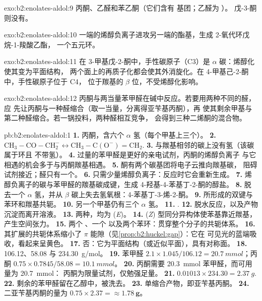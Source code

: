 \begin{solution}{exo:b2:enolates-aldol:9}
丙酮、乙醛和苯乙酮（它们含有  基团；乙醛为 ）。
戊-3-酮则没有。
\end{solution}

\begin{solution}{exo:b2:enolates-aldol:10}
一端的烯醇负离子进攻另一端的酯基，生成 2-氧代环戊烷-1-羧酸乙酯，
一个五元环。
\end{solution}

\begin{solution}{exo:b2:enolates-aldol:11}
在 3-甲基戊-2-酮中，手性碳原子（C3）是 $\alpha$ 碳：烯醇化使其变为平面结构，
两个面上的再质子化都会使其外消旋化。在 4-甲基己-2-酮中，手性碳原子位于 C4，
位于羰基的 $\beta$ 位，不受烯醇化影响。
\end{solution}

\begin{solution}{exo:b2:enolates-aldol:12}
丙酮与两当量苯甲醛在碱中反应。若要用两种不同的醛，应
先让丙酮与一种醛缩合（取一当量，分离得亚苄基丙酮），再
使其剩余甲基与第二种醛缩合。若一锅投料，两种醛相互竞争，
会得到三种二烯酮的混合物。
\end{solution}

\begin{solution}{pb:b2:enolates-aldol:1}
\textbf{1.} 丙酮，含六个 $\alpha$ 氢（每个甲基上三个）。
\textbf{2.} $\mathrm{CH_3{-}CO{-}CH_2^-} \leftrightarrow \mathrm{CH_3{-}C(O^-){=}CH_2}$.
\textbf{3.} 与羰基相邻的碳上没有氢（该碳属于环且
不带氢）。
\textbf{4.} 过量的苯甲醛是更好的亲电试剂，丙酮的烯醇负离子
与它相遇的机会多于与丙酮羰基相遇。
\textbf{5.} 酮有两个碳基团将电子云推向羰基碳，
阻碍试剂接近；醛只有一个。
\textbf{6.} 只需少量烯醇负离子：反应时它会重新生成。
\textbf{7.} 烯醇负离子的碳与苯甲醛的羰基碳成键，生成
4-羟基-4-苯基丁-2-酮的醇盐。
\textbf{8.} 脱去一个 $\alpha$ 氢，并从 $\beta$ 碳上失去氢氧根：4-苯基丁-3-烯-2-酮。
\textbf{9.} 所形成的双键与苯环和羰基共轭。
\textbf{10.} 另一个甲基仍有三个 $\alpha$ 氢。
\textbf{11.} .
\textbf{12.} 脱水反应，以及产物沉淀而离开溶液。
\textbf{13.} 两种，均为 (\textit{E})。
\textbf{14.} (\textit{Z}) 型同分异构体使苯基靠近羰基，产生空间张力。
\textbf{15.} 两个 、一个  以及两个苯环：贯穿整个分子的共轭体系。
\textbf{16.} 其扩展的共轭体系缩小了 $\pi$ 能隙（见\cref{prop:b2:huckel:gap}）：它在
可见光的蓝端吸收，看起来呈黄色。
\textbf{17.} 否：它为平面结构（或近似平面），具有对称面。
\textbf{18.} 106.12、58.08 与 \qty{234.30}{g/mol}。
\textbf{19.} 苯甲醛 $2.1 \times 1.045/106.12 = \qty{20.7}{mmol}$；丙酮 $0.75 \times
0.7845/58.08 = \qty{10.1}{mmol}$。
\textbf{20.} 丙酮需要 \qty{20.3}{mmol} 苯甲醛，而可用量为 \qty{20.7}{mmol}：
丙酮为限量试剂，仅勉强足量。
\textbf{21.} $0.01013 \times 234.30 = \qty{2.37}{g}$.
\textbf{22.} 剩余的苯甲醛留在乙醇中，被洗去。
\textbf{23.} 单缩合产物，即亚苄基丙酮。
\textbf{24.} 二亚苄基丙酮的量为 $0.75 \times 2.37 = \boldsymbol{\approx \qty{1.78}{g}}$。
\end{solution}
